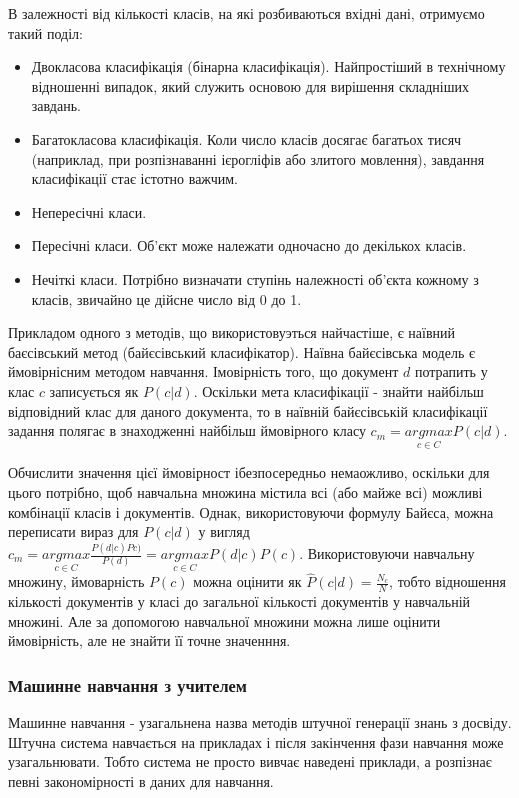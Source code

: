 В залежності від кількості класів, на які розбиваються вхідні дані, отримуємо такий поділ:
\begin{itemize}  
	\item Двокласова класифікація (бінарна класифікація). Найпростіший в технічному відношенні випадок, який служить основою для вирішення складніших завдань.
	\item Багатокласова класифікація. Коли число класів досягає багатьох тисяч (наприклад, при розпізнаванні ієрогліфів або злитого мовлення), завдання класифікації стає істотно важчим.
	\item Непересічні класи.
	\item Пересічні класи. Об'єкт може належати одночасно до декількох класів.
	\item Нечіткі класи. Потрібно визначати ступінь належності об'єкта кожному з класів, звичайно це дійсне число від 0 до 1.
\end{itemize}

Прикладом одного з методів, що використовуэться найчастіше, є наївний баєсівський метод (байєсівський класифікатор). Наївна байєсівська модель є ймовірнісним методом навчання. Імовірність того, що документ $d$ потрапить у клас $c$ записується як $P(c|d)$. Оскільки мета класифікації - знайти найбільш відповідний клас для даного документа, то в наївній байєсівській класифікації задання полягає в знаходженні найбільш ймовірного класу $c_{m} = \underset{c \in C}{argmax} P(c|d)$.

Обчислити значення цієї ймовірност ібезпосередньо немаожливо, оскільки для цього потрібно, щоб навчальна множина містила всі (або майже всі) можливі комбінації класів і документів. Однак, використовуючи формулу Байєса, можна переписати вираз для $P(c|d)$ у вигляд $c_{m} = \underset{c \in C}{argmax} \frac{P(d|c)P{c)}}{P(d)} = \underset{c \in C}{argmax} P(d|c) P(c)$.
Використовуючи навчальну множину, ймоварність $P(c)$ можна оцінити як $\hat{P}(c|d)=\frac{N_{c}}{N}$, тобто відношення кількості документів у класі до загальної кількості документів у навчальній множині. Але за допомогою навчальної множини можна лише оцінити ймовірність, але не знайти її точне значенння. 

\subsubsection{Машинне навчання з учителем}
Машинне навчання - узагальнена назва методів штучної генерації знань з досвіду. Штучна система навчається на прикладах і після закінчення фази навчання може узагальнювати. Тобто система не просто вивчає наведені приклади, а розпізнає певні закономірності в даних для навчання.

